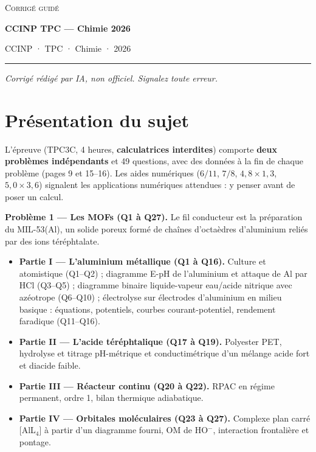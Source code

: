 \documentclass[11pt,a4paper]{article}
\providecommand{\tightlist}{\setlength{\itemsep}{0pt}\setlength{\parskip}{0pt}}
\begin{document}
\thispagestyle{plain}
\begin{center}
  {\small\scshape Corrigé guidé}\par\smallskip
  {\LARGE\bfseries CCINP TPC — Chimie 2026\par}\medskip
  {\large CCINP · TPC · Chimie · 2026\par}
\end{center}
\vspace{2pt}\hrule\vspace{8pt}

\emph{Corrigé rédigé par IA, non officiel. Signalez toute erreur.}

\hypertarget{pruxe9sentation-du-sujet}{%
\section{Présentation du sujet}\label{pruxe9sentation-du-sujet}}

L'épreuve (TPC3C, 4 heures, \textbf{calculatrices interdites}) comporte \textbf{deux problèmes indépendants} et 49 questions, avec des données à la fin de chaque problème (pages 9 et 15--16). Les aides numériques (\(6/11\), \(7/8\), \(4{,}8\times1{,}3\), \(5{,}0\times3{,}6\)) signalent les applications numériques attendues : y penser avant de poser un calcul.

\textbf{Problème 1 --- Les MOFs (Q1 à Q27).} Le fil conducteur est la préparation du MIL-53(Al), un solide poreux formé de chaînes d'octaèdres d'aluminium reliés par des ions téréphtalate.

\begin{itemize}
\tightlist
\item
  \textbf{Partie I --- L'aluminium métallique (Q1 à Q16).} Culture et atomistique (Q1--Q2) ; diagramme E-pH de l'aluminium et attaque de Al par HCl (Q3--Q5) ; diagramme binaire liquide-vapeur eau/acide nitrique avec azéotrope (Q6--Q10) ; électrolyse sur électrodes d'aluminium en milieu basique : équations, potentiels, courbes courant-potentiel, rendement faradique (Q11--Q16).
\item
  \textbf{Partie II --- L'acide téréphtalique (Q17 à Q19).} Polyester PET, hydrolyse et titrage pH-métrique et conductimétrique d'un mélange acide fort et diacide faible.
\item
  \textbf{Partie III --- Réacteur continu (Q20 à Q22).} RPAC en régime permanent, ordre 1, bilan thermique adiabatique.
\item
  \textbf{Partie IV --- Orbitales moléculaires (Q23 à Q27).} Complexe plan carré {[}AlL\(_4\){]} à partir d'un diagramme fourni, OM de HO\(^-\), interaction frontalière et pontage.
\end{itemize}
\end{document}
